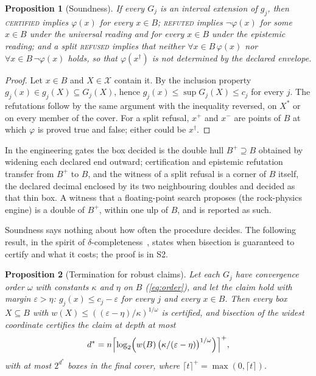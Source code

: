 \documentclass[preprint,11pt,a4paper]{elsarticle}
\newtheorem{proposition}{Proposition}
\theoremstyle{definition}
\newcommand{\verdict}[1]{\textup{\textsc{#1}}}
\newcommand{\CERT}{\verdict{certified}}
\newcommand{\REFT}{\verdict{refuted}}
\newcommand{\REFS}{\verdict{refused}}
\newcommand{\supp}[1]{S#1}
\begin{document}
\begin{proposition}[Soundness]\label{prop:sound}
If every $G_j$ is an interval extension of $g_j$, then \CERT{} implies $\varphi(x)$ for every $x\in B$; \REFT{} implies $\neg\varphi(x)$ for some $x\in B$ under the universal reading and for every $x\in B$ under the epistemic reading; and a split \REFS{} implies that neither $\forall x\in B\,\varphi(x)$ nor $\forall x\in B\,\neg\varphi(x)$ holds, so that $\varphi(x^\dagger)$ is not determined by the declared envelope.
\end{proposition}
\begin{proof}
Let $x\in B$ and $X\in\mathcal{X}$ contain it. By the inclusion property $g_j(x)\in g_j(X)\subseteq G_j(X)$, hence $g_j(x)\le\sup G_j(X)\le c_j$ for every $j$. The refutations follow by the same argument with the inequality reversed, on $X^*$ or on every member of the cover. For a split refusal, $x^+$ and $x^-$ are points of $B$ at which $\varphi$ is proved true and false; either could be $x^\dagger$.
\end{proof}
In the engineering gates the box decided is the double hull $B^+\supseteq B$ obtained by widening each declared end outward; certification and epistemic refutation transfer from $B^+$ to $B$, and the witness of a split refusal is a corner of $B$ itself, the declared decimal enclosed by its two neighbouring doubles and decided as that thin box. A witness that a floating-point search proposes (the rock-physics engine) is a double of $B^+$, within one ulp of $B$, and is reported as such.

Soundness says nothing about how often the procedure decides. The following result, in the spirit of $\delta$-completeness~\citep{GaoAvigadClarke12}, states when bisection is guaranteed to certify and what it costs; the proof is in \supp{2}.

\begin{proposition}[Termination for robust claims]\label{prop:termination}
Let each $G_j$ have convergence order $\omega$ with constants $\kappa$ and $\eta$ on $B$ (\cref{eq:order}), and let the claim hold with margin $\varepsilon>\eta$: $g_j(x)\le c_j-\varepsilon$ for every $j$ and every $x\in B$. Then every box $X\subseteq B$ with $w(X)\le((\varepsilon-\eta)/\kappa)^{1/\omega}$ is certified, and bisection of the widest coordinate certifies the claim at depth at most
\begin{equation}\label{eq:depth}
d^*=n\Bigl\lceil\log_2\Bigl(w(B)\,\bigl(\kappa/(\varepsilon-\eta)\bigr)^{1/\omega}\Bigr)\Bigr\rceil^{+},
\end{equation}
with at most $2^{d^*}$ boxes in the final cover, where $\lceil t\rceil^{+}=\max(0,\lceil t\rceil)$.
\end{proposition}
\end{document}
